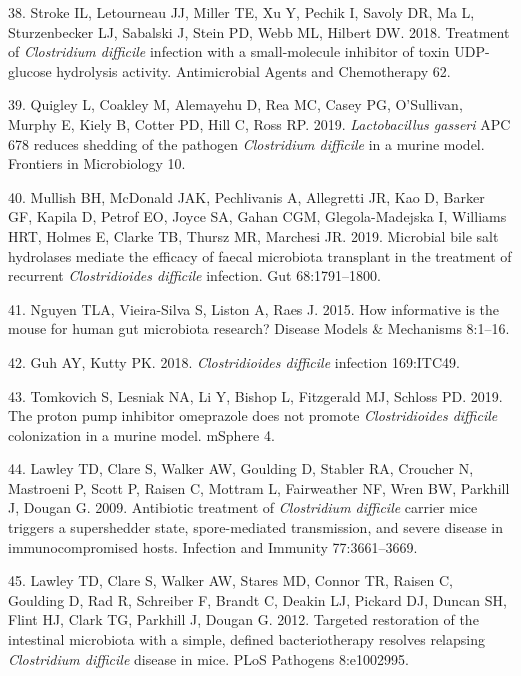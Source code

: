 \documentclass[
  11pt,
]{article}
\begin{document}
\leavevmode\hypertarget{ref-Stroke2018}{}%
38. Stroke IL, Letourneau JJ, Miller TE, Xu Y, Pechik I, Savoly DR, Ma
L, Sturzenbecker LJ, Sabalski J, Stein PD, Webb ML, Hilbert DW. 2018.
Treatment of \emph{Clostridium difficile} infection with a
small-molecule inhibitor of toxin UDP-glucose hydrolysis activity.
Antimicrobial Agents and Chemotherapy 62.

\leavevmode\hypertarget{ref-Quigley2019}{}%
39. Quigley L, Coakley M, Alemayehu D, Rea MC, Casey PG, O'Sullivan,
Murphy E, Kiely B, Cotter PD, Hill C, Ross RP. 2019. \emph{Lactobacillus
gasseri} APC 678 reduces shedding of the pathogen \emph{Clostridium
difficile} in a murine model. Frontiers in Microbiology 10.

\leavevmode\hypertarget{ref-Mullish2019}{}%
40. Mullish BH, McDonald JAK, Pechlivanis A, Allegretti JR, Kao D,
Barker GF, Kapila D, Petrof EO, Joyce SA, Gahan CGM, Glegola-Madejska I,
Williams HRT, Holmes E, Clarke TB, Thursz MR, Marchesi JR. 2019.
Microbial bile salt hydrolases mediate the efficacy of faecal microbiota
transplant in the treatment of recurrent \emph{Clostridioides difficile}
infection. Gut 68:1791--1800.

\leavevmode\hypertarget{ref-Nguyen2015}{}%
41. Nguyen TLA, Vieira-Silva S, Liston A, Raes J. 2015. How informative
is the mouse for human gut microbiota research? Disease Models \&
Mechanisms 8:1--16.

\leavevmode\hypertarget{ref-Guh2018}{}%
42. Guh AY, Kutty PK. 2018. \emph{Clostridioides difficile} infection
169:ITC49.

\leavevmode\hypertarget{ref-Tomkovich2019}{}%
43. Tomkovich S, Lesniak NA, Li Y, Bishop L, Fitzgerald MJ, Schloss PD.
2019. The proton pump inhibitor omeprazole does not promote
\emph{Clostridioides difficile} colonization in a murine model. mSphere
4.

\leavevmode\hypertarget{ref-Lawley2009}{}%
44. Lawley TD, Clare S, Walker AW, Goulding D, Stabler RA, Croucher N,
Mastroeni P, Scott P, Raisen C, Mottram L, Fairweather NF, Wren BW,
Parkhill J, Dougan G. 2009. Antibiotic treatment of \emph{Clostridium
difficile} carrier mice triggers a supershedder state, spore-mediated
transmission, and severe disease in immunocompromised hosts. Infection
and Immunity 77:3661--3669.

\leavevmode\hypertarget{ref-Lawley2012}{}%
45. Lawley TD, Clare S, Walker AW, Stares MD, Connor TR, Raisen C,
Goulding D, Rad R, Schreiber F, Brandt C, Deakin LJ, Pickard DJ, Duncan
SH, Flint HJ, Clark TG, Parkhill J, Dougan G. 2012. Targeted restoration
of the intestinal microbiota with a simple, defined bacteriotherapy
resolves relapsing \emph{Clostridium difficile} disease in mice. PLoS
Pathogens 8:e1002995.
\end{document}
